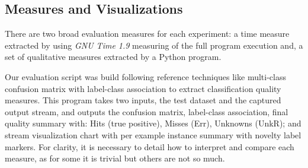 






\subsection{Measures and Visualizations}

There are two broad evaluation measures for each experiment: a time measure
extracted by using \emph{GNU Time 1.9} measuring of the full program execution
and, a set of qualitative measures extracted by a Python program.

Our evaluation script was build following reference techniques like multi-class
confusion matrix with label-class association \cite{Faria2015minas} to extract
classification quality measures.
This program takes two inputs, the test dataset and the captured output stream,
and outputs the confusion matrix, label-class association,
final quality summary with:
Hits (true positive), Misses (Err), Unknowns (UnkR); and
stream visualization chart with per example instance summary with novelty label markers.
% 
For clarity, it is necessary to detail how to interpret and compare each measure,
as for some it is trivial but others are not so much.

